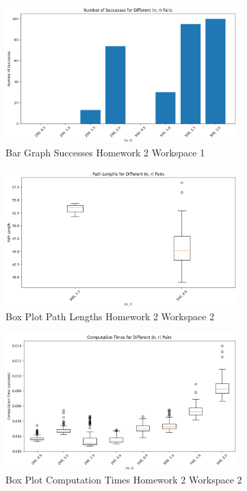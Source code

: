 \documentclass{article}
\begin{document}
\begin{figure}[h]
    \centering
    \includegraphics[width=0.8\textwidth]{e1b2w1successes.png}
    \caption{Bar Graph Successes Homework 2 Workspace 1}
    \label{fig:e1b2w1successes}
\end{figure}

\begin{figure}[h]
    \centering
    \includegraphics[width=0.8\textwidth]{e1b2w2pathLengths.png}
    \caption{Box Plot Path Lengths Homework 2 Workspace 2}
    \label{fig:e1b2w2pathLengths}
\end{figure}

\begin{figure}[h]
    \centering
    \includegraphics[width=0.8\textwidth]{e1b2w2times.png}
    \caption{Box Plot Computation Times Homework 2 Workspace 2}
    \label{fig:e1b2w2times}
\end{figure}
\end{document}
